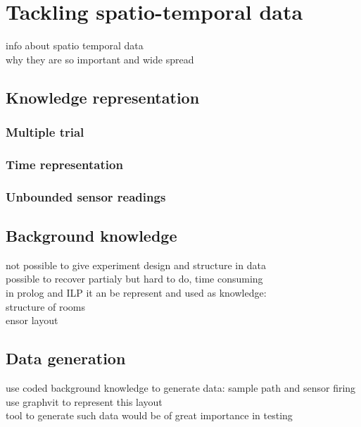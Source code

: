 \documentclass[12pt, a4paper, pdflatex, leqno, twoside]{report}
\begin{document}
\chapter{Tackling spatio-temporal data}

info about spatio temporal data\\
why they are so important and wide spread\\

\section{Knowledge representation}
\subsection{Multiple trial}
\subsection{Time representation}
\subsection{Unbounded sensor readings}

\section{Background knowledge}
not possible to give experiment design and structure in data\\
possible to recover partialy but hard to do, time consuming\\

in prolog and ILP it an be represent and used as knowledge:\\
structure of rooms\\
ensor layout\\


\section{Data generation}
use coded background knowledge to generate data: sample path and sensor firing\\
use graphvit to represent this layout\\
tool to generate such data would be of great importance in testing 

\section{}
\end{document}
